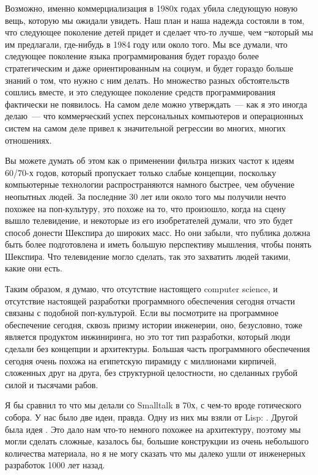 
\clearpage
{}

Возможно, именно коммерциализация в 1980х годах убила следующую новую вещь, которую мы ожидали увидеть.
Наш план и наша надежда состояли в том, что следующее поколение детей придет и сделает что-то лучше, 
чем \st\ который мы им предлагали, где-нибудь в 1984 году или около того.
Мы все думали, что следующее поколение языка программирования будет гораздо более стратегическим и 
даже ориентированным на социум, и будет гораздо больше знаний о том, что нужно с ним делать.
Но множество разных обстоятельств сошлись вместе, и это следующее поколение средств программирования фактически не появилось.
На самом деле можно утверждать\ --- как я это иногда делаю\ --- что коммерческий успех
персональных компьютеров и операционных систем на самом деле привел к значительной регрессии во многих, многих отношениях.

Вы можете думать об этом как о применении фильтра низких частот к идеям 60/70-х годов,
который пропускает только слабые концепции, поскольку компьютерные технологии распространяются
намного быстрее, чем обучение неопытных людей.
За последние 30 лет или около того мы получили нечто похожее на поп-культуру, 
это похоже на то, что произошло, когда на сцену вышло телевидение, и некоторые из его 
изобретателей думали, что это будет способ донести Шекспира до широких масс.
Но они забыли, что публика должна быть более подготовлена и иметь большую перспективу мышления, чтобы понять Шекспира.
Что телевидение могло сделать, так это захватить людей такими, какие они есть.

Таким образом, я думаю, что отсутствие настоящего computer science, и отсутствие 
настоящей разработки программного обеспечения сегодня отчасти связаны с подобной поп-культурой.
Если вы посмотрите на программное обеспечение сегодня, сквозь призму истории инженерии, 
оно, безусловно, тоже является продуктом инжиниринга, но это тот тип разработки,
который люди сделали без концепции и архитектуры.
Большая часть программного обеспечения сегодня очень похожа на египетскую пирамиду
с миллионами кирпичей, сложенных друг на друга, без структурной целостности,
но сделанных грубой силой и тысячами рабов.

Я бы сравнил то что мы делали со Smalltalk в 70х, с чем-то вроде готического собора.
У нас было две идеи, правда. Одну из них мы взяли от Lisp: .
Другой была идея . Это дало нам что-то немного похожее на архитектуру, 
поэтому мы могли сделать сложные, казалось бы, большие конструкции из очень 
небольшого количества материала, но я не могу сказать что мы далеко 
ушли от инженерных разработок 1000 лет назад.

